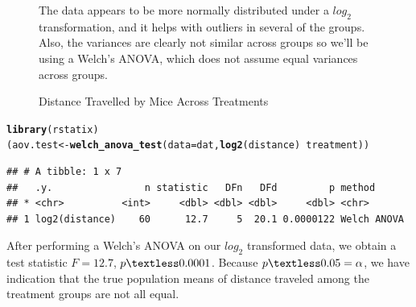 \documentclass{article}\usepackage[]{graphicx}\usepackage[]{xcolor}
\makeatletter
\newcommand{\hlopt}[1]{\textcolor[rgb]{0,0,0}{#1}}%
\newcommand{\hldef}[1]{\textcolor[rgb]{0.345,0.345,0.345}{#1}}%
\newcommand{\hlkwb}[1]{\textcolor[rgb]{0.69,0.353,0.396}{#1}}%
\newcommand{\hlkwc}[1]{\textcolor[rgb]{0.333,0.667,0.333}{#1}}%
\newcommand{\hlkwd}[1]{\textcolor[rgb]{0.737,0.353,0.396}{\textbf{#1}}}%
\newenvironment{kframe}{%
 \def\at@end@of@kframe{}%
 \ifinner\ifhmode%
  \def\at@end@of@kframe{\end{minipage}}%
  \begin{minipage}{\columnwidth}%
 \fi\fi%
 \def\FrameCommand##1{\hskip\@totalleftmargin \hskip-\fboxsep
 \colorbox{shadecolor}{##1}\hskip-\fboxsep
     \hskip-\linewidth \hskip-\@totalleftmargin \hskip\columnwidth}%
 \MakeFramed {\advance\hsize-\width
   \@totalleftmargin\z@ \linewidth\hsize
   \@setminipage}}%
 {\par\unskip\endMakeFramed%
 \at@end@of@kframe}
\newenvironment{knitrout}{}{} %
\makeatother
\begin{document}
\begin{figure}[H]
The data appears to be more normally distributed under a $log_{2}$ transformation, and it helps with outliers in several of the groups. Also, the variances are clearly not similar across groups so we'll be using a Welch's ANOVA, which does not assume equal variances across groups. 

\label{mouse_summary}
\caption{Distance Travelled by Mice Across Treatments}

\end{figure}

\begin{knitrout}\scriptsize
{}\color{fgcolor}\begin{kframe}
\begin{alltt}
\hlkwd{library}\hldef{(rstatix)}
\hldef{(aov.test} \hlkwb{<-} \hlkwd{welch_anova_test}\hldef{(}\hlkwc{data} \hldef{= dat,} \hlkwd{log2}\hldef{(distance)} \hlopt{~} \hldef{treatment))}
\end{alltt}
\begin{verbatim}
## # A tibble: 1 x 7
##   .y.                n statistic   DFn   DFd         p method     
## * <chr>          <int>     <dbl> <dbl> <dbl>     <dbl> <chr>      
## 1 log2(distance)    60      12.7     5  20.1 0.0000122 Welch ANOVA
\end{verbatim}
\end{kframe}
\end{knitrout}

After performing a Welch's ANOVA on our $log_{2}$ transformed data, we obtain a test statistic $F = 12.7$, $p \textless 0.0001$. Because $p \textless 0.05 = \alpha$, we have indication that the true population means of distance traveled among the treatment groups are not all equal. 
\end{document}
